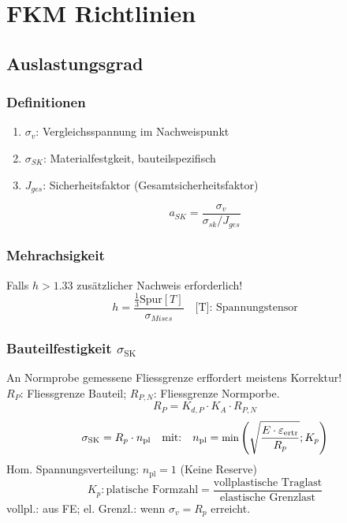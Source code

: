 \section{FKM Richtlinien}{}
    \subsection{Auslastungsgrad}
     
        \subsubsection{Definitionen}
            \begin{enumerate}[noitemsep]
                \item $\sigma_{v}$: Vergleichsspannung im Nachweispunkt
                \item $\sigma_{SK}$: Materialfestgkeit, bauteilspezifisch
                \item $J_{ges}$: Sicherheitsfaktor (Gesamtsicherheitsfaktor)
            \end{enumerate}
            \[a_{SK} = \frac{\sigma_{v}}{\sigma_{sk}/J_{ges}} \]
    
        \subsubsection{Mehrachsigkeit}
            Falls $h > 1.33$ zusätzlicher Nachweis erforderlich! 
            \[ h = \frac{\frac{1}{3} \textrm{Spur}[T]}{\sigma_{Mises}} \quad \textrm{[T]: Spannungstensor}\]
        \subsubsection{Bauteilfestigkeit $\sigma_{\textrm{SK}}$}
            An Normprobe gemessene Fliessgrenze erffordert meistens Korrektur! \\$R_P$: Fliessgrenze Bauteil; $R_{P,N}$: Fliessgrenze Normporbe.
            \vspace{-2mm}
            \[R_P = K_{d,P}\cdot K_A\cdot R_{P,N}\]
            \vspace{-5mm}
            \[\sigma_{\textrm{SK}}=R_p\cdot n_{\textrm{pl}} \quad\textrm{mit:}\quad \small n_{\textrm{pl}}=\textrm{min} \left( \sqrt{ \frac{E\cdot\varepsilon_{\textrm{ertr}}}{R_p}};K_p \right) \]\normalsize
            Hom. Spannungsverteilung: $n_{\textrm{pl}}=1$ (Keine Reserve)
            \vspace{-2mm}
            \[K_p: \textrm{platische Formzahl} = \frac{\textrm{vollplastische Traglast}}{\textrm{elastische Grenzlast}}\]
            vollpl.: aus FE; el. Grenzl.: wenn $\sigma_v = R_p$ erreicht.
